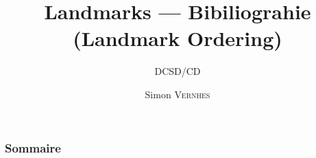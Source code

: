 \documentclass[french]{beamer}
\title{Landmarks — Bibiliograhie (Landmark Ordering)}
\subtitle{\footnotesize DCSD/CD}
\author{{\Large Simon \textsc{Vernhes}}}
\institute{\textsc{{\large Onera}}}
\date{\oldstylenums{\today}}
\begin{document}
	\begin{frame}
		\titlepage
	\end{frame}

	\begin{frame}
		\frametitle{Sommaire}
		\small \tableofcontents
	\end{frame}

  
  
  
  
\end{document}
